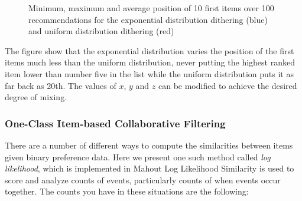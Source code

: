 

\begin{figure}[H]
	\label{fig:minmaxuniform}
	\centering
	\caption{Minimum, maximum and average position of 10 first items over 100 recommendations for the exponential distribution dithering (blue) and uniform distribution dithering (red)}

\end{figure}

The figure show that the exponential distribution varies the position of the first items much less
than the uniform distribution, never putting the highest ranked item lower than number five in the
list while the uniform distribution puts it as far back as 20th. The values of $x$, $y$ and $z$ can be modified to
achieve the desired degree of mixing.

\subsubsection{One-Class Item-based Collaborative Filtering}

There are a number of different ways to compute the similarities between items given binary preference data.
Here we present one such method called \emph{log likelihood}, which is implemented in Mahout \cite{mahout}
Log Likelihood Similarity is used to score and analyze counts of events, particularly counts of when events occur together.
The counts you have in these situations are the following:

